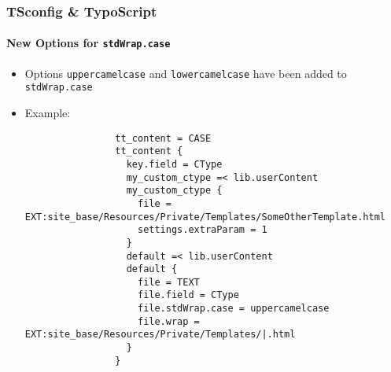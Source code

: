 \begin{frame}[fragile]
	\frametitle{TSconfig \& TypoScript}
	\framesubtitle{New Options for \texttt{stdWrap.case}}

	\lstset{basicstyle=\tiny\ttfamily}

	\begin{itemize}

		\item Options \texttt{uppercamelcase} and \texttt{lowercamelcase} have been added
			to \texttt{stdWrap.case}

		\item Example:

			\begin{lstlisting}
				tt_content = CASE
				tt_content {
				  key.field = CType
				  my_custom_ctype =< lib.userContent
				  my_custom_ctype {
				    file = EXT:site_base/Resources/Private/Templates/SomeOtherTemplate.html
				    settings.extraParam = 1
				  }
				  default =< lib.userContent
				  default {
				    file = TEXT
				    file.field = CType
				    file.stdWrap.case = uppercamelcase
				    file.wrap = EXT:site_base/Resources/Private/Templates/|.html
				  }
				}
			\end{lstlisting}

	\end{itemize}

\end{frame}


